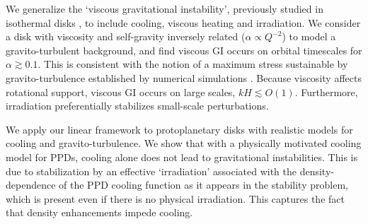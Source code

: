 
We generalize the `viscous gravitational instability', previously 
studied in isothermal disks
\citep{lynden-bell74,willerding92,gammie96}, to include 
cooling, viscous heating and irradiation. %
We consider a disk with viscosity and self-gravity inversely
related ($\alpha\propto Q^{-2}$) to model a 
gravito-turbulent background, and find viscous GI occurs on orbital
timescales for $\alpha\gtrsim 0.1$. This is consistent with the notion 
of a maximum stress sustainable by gravito-turbulence established 
by numerical simulations \citep{rice05}. Because viscosity affects 
rotational support, viscous GI occurs on large scales, $kH\lesssim
O(1)$.  Furthermore, irradiation preferentially
stabilizes small-scale perturbations. %
                             

We apply our linear framework to protoplanetary disks with 
realistic models for cooling and gravito-turbulence. 
We show that with a physically motivated cooling model for PPDs, 
cooling alone does not lead to gravitational instabilities. This is
due to stabilization by an effective `irradiation' associated with the 
density-dependence of the PPD cooling function as it appears in the
stability problem, which is present even if there is no physical
irradiation. This captures the fact that density enhancements impede cooling. 
 



